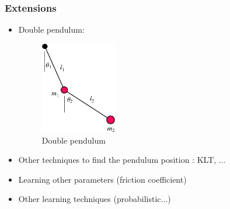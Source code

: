 \documentclass{beamer}
\begin{document}
\begin{frame}
\frametitle{Extensions}
\begin{itemize}
  \item Double pendulum:
    \begin{figure}
      \captionsetup{labelformat=empty}
      \includegraphics[height=4cm]{pendule_double.png}
      \caption{Double pendulum}
    \end{figure}
  \item Other techniques to find the pendulum position : KLT, ...
  \item Learning other parameters (friction coefficient)
  \item Other learning techniques (probabilistic...)
\end{itemize}
\end{frame}
\end{document}
